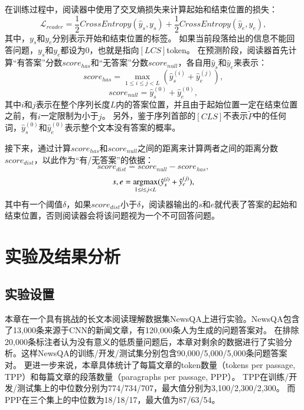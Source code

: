 在训练过程中，阅读器中使用了交叉熵损失来计算起始和结束位置的损失：
\begin{equation}
    \mathcal L_{reader} = \frac{1}{2} CrossEntropy(\hat y_s,y_s) + \frac{1}{2} CrossEntropy(\hat y_e,y_e),
\end{equation}
其中，$y_s$和$y_e$分别表示开始和结束位置的标签。
如果当前段落给出的信息不能回答问题，$y_s$和$y_e$都设为0，也就是指向$[LCS]$token。
在预测阶段，阅读器首先计算“有答案”分数$score_{has}$和“无答案”分数$score_{null}$，各自用$\hat y_s$和$\hat y_e$来表示：
\begin{equation}
    score_{has}=\max \limits_{1\le i\le j<L}(\hat y_{s}^{(i)}+\hat y_{e}^{(j)}),
\end{equation}
\begin{equation}
    score_{null}=\hat y_{s}^{(0)}+\hat y_{e}^{(0)},
\end{equation}
其中$i$和$j$表示在整个序列长度$L$内的答案位置，并且由于起始位置一定在结束位置之前，有$i$一定限制为小于$j$。
另外，鉴于序列首部的$[CLS]$不表示$\tilde P$中的任何词，$\hat y^{(0)}_s$和$\hat y^{(0)}_e$表示整个文本没有答案的概率。

接下来，通过计算$score_{has}$和$score_{null}$之间的距离来计算两者之间的距离分数$score_{dist}$，以此作为“有/无答案”的依据：
\begin{equation}
    score_{dist}=score_{null}-score_{has},
\end{equation}
\begin{equation}
    s,e=\operatorname*{argmax} \limits_{1\le i\le j<L}(\hat y_{s}^{(i)}+\hat y_{e}^{(j)}),
\end{equation}
其中有一个阈值$\delta$，如果$score_{dist}$小于$\delta$，阅读器输出的$s$和$e$就代表了答案的起始和结束位置，否则阅读器会将该问题视为一个不可回答问题。

\section{实验及结果分析}

\subsection{实验设置}
本章在一个具有挑战的长文本阅读理解数据集NewsQA上进行实验。NewsQA包含了13,000条来源于CNN的新闻文章，有120,000条人为生成的问题答案对。
在排除20,000条标注者认为没有意义的低质量问题后，本章对剩余的数据进行了实验分析。这样NewsQA的训练/开发/测试集分别包含90,000/5,000/5,000条问题答案对。
更进一步来说，本章具体统计了每篇文章的token数量（tokens per passage, TPP）和每篇文章的段落数量（paragraphs per passage, PPP）。
TPP在训练/开发/测试集上的中位数分别为774/734/707，最大值分别为3,100/2,300/2,300。
而PPP在三个集上的中位数为18/18/17，最大值为87/63/54。

